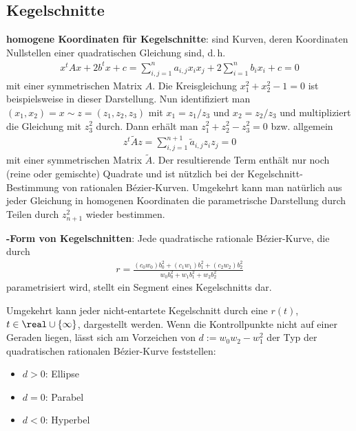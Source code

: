 \pagebreak

\subsection{%
    Kegelschnitte%
}

\textbf{homogene Koordinaten für Kegelschnitte}:
 sind Kurven, deren Koordinaten Nullstellen einer quadratischen Gleichung
sind, d.\,h.
\begin{align*}
    x^t A x + 2 b^t x + c = \sum_{i,j=1}^n a_{i,j} x_i x_j + 2 \sum_{i=1}^n b_i x_i + c = 0
\end{align*}
mit einer symmetrischen Matrix $A$.
Die Kreisgleichung $x_1^2 + x_2^2 - 1 = 0$ ist beispielsweise in dieser Darstellung.
Nun identifiziert man $(x_1, x_2) = x \sim z = (z_1, z_2, z_3)$ mit
$x_1 = z_1/z_3$ und $x_2 = z_2/z_3$ und multipliziert die Gleichung mit $z_3^2$ durch.
Dann erhält man $z_1^2 + z_2^2 - z_3^2 = 0$ bzw. allgemein
\begin{align*}
    z^t \widetilde{A} z = \sum_{i,j=1}^{n+1} \widetilde{a}_{i,j} z_i z_j = 0
\end{align*}
mit einer symmetrischen Matrix $\widetilde{A}$.
Der resultierende Term enthält nur noch (reine oder gemischte) Quadrate
und ist nützlich bei der Kegelschnitt-Bestimmung von rationalen Bézier-Kurven.
Umgekehrt kann man natürlich aus jeder Gleichung in homogenen Koordinaten die parametrische
Darstellung durch Teilen durch $z_{n+1}^2$ wieder bestimmen.

\linie

\textbf{-Form von Kegelschnitten}:
Jede quadratische rationale Bézier-Kurve, die durch
\begin{align*}
    r = \frac{(c_0 w_0) b_0^2 + (c_1 w_1) b_1^2 + (c_2 w_2) b_2^2}
    {w_0 b_0^2 + w_1 b_1^2 + w_2 b_2^2}
\end{align*}
parametrisiert wird, stellt ein Segment eines Kegelschnitts dar.

Umgekehrt kann jeder nicht-entartete Kegelschnitt durch eine 
$r(t)$, $t \in \real \cup \{\infty\}$, dargestellt werden.
Wenn die Kontrollpunkte nicht auf einer Geraden liegen, lässt sich am Vorzeichen von
$d := w_0 w_2 - w_1^2$ der Typ der quadratischen rationalen Bézier-Kurve feststellen:
\begin{itemize}
    \item
    $d > 0$: Ellipse
    
    \item
    $d = 0$: Parabel
    
    \item
    $d < 0$: Hyperbel
\end{itemize}

